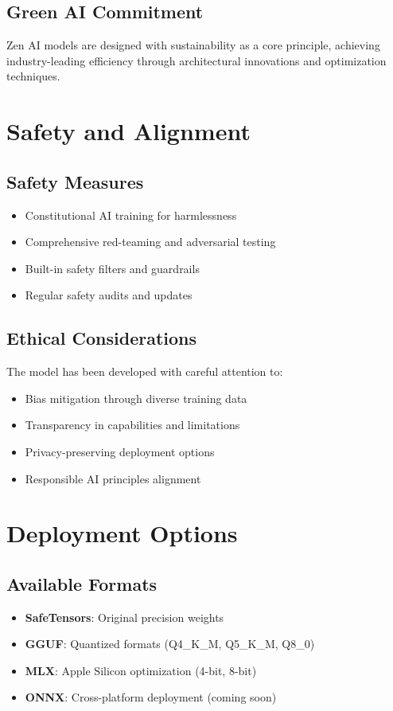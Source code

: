 \documentclass[11pt,a4paper]{article}
\begin{document}
\subsection{Green AI Commitment}
Zen AI models are designed with sustainability as a core principle, achieving industry-leading efficiency 
through architectural innovations and optimization techniques.

\section{Safety and Alignment}

\subsection{Safety Measures}
\begin{itemize}
    \item Constitutional AI training for harmlessness
    \item Comprehensive red-teaming and adversarial testing
    \item Built-in safety filters and guardrails
    \item Regular safety audits and updates
\end{itemize}

\subsection{Ethical Considerations}
The model has been developed with careful attention to:
\begin{itemize}
    \item Bias mitigation through diverse training data
    \item Transparency in capabilities and limitations
    \item Privacy-preserving deployment options
    \item Responsible AI principles alignment
\end{itemize}

\section{Deployment Options}

\subsection{Available Formats}
\begin{itemize}
    \item \textbf{SafeTensors}: Original precision weights
    \item \textbf{GGUF}: Quantized formats (Q4\_K\_M, Q5\_K\_M, Q8\_0)
    \item \textbf{MLX}: Apple Silicon optimization (4-bit, 8-bit)
    \item \textbf{ONNX}: Cross-platform deployment (coming soon)
\end{itemize}
\end{document}
